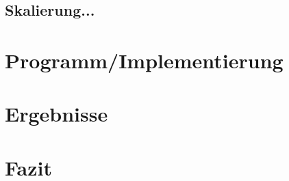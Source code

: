 \documentclass[10pt,a4paper]{article}
\begin{document}
\subsection{Skalierung...}


\section{Programm/Implementierung}

\section{Ergebnisse}

\section{Fazit}

\end{document}
